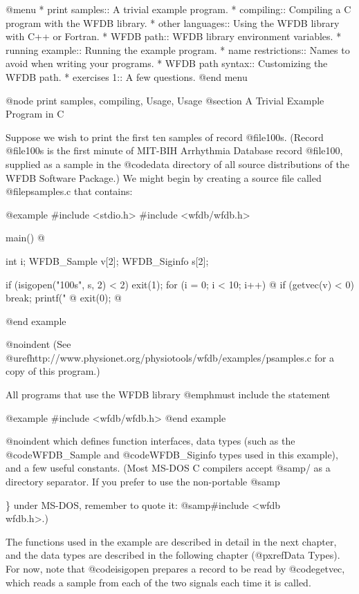 {@menu
* print samples::		A trivial example program.
* compiling::			Compiling a C program with the WFDB library.
* other languages::             Using the WFDB library with C++ or Fortran.
* WFDB path::			WFDB library environment variables.
* running example::		Running the example program.
* name restrictions::		Names to avoid when writing your programs.
* WFDB path syntax::		Customizing the WFDB path.
* exercises 1::			A few questions.
@end menu

@node     print samples, compiling, Usage, Usage
@section A Trivial Example Program in C

Suppose we wish to print the first ten samples of record @file{100s}.
(Record @file{100s} is the first minute of MIT-BIH Arrhythmia Database
record @file{100}, supplied as a sample in the @code{data} directory of all
source distributions of the WFDB Software Package.)  We might begin by
creating a source file called @file{psamples.c} that contains:

@example
#include <stdio.h>
#include <wfdb/wfdb.h>

main()
@{
    int i;
    WFDB_Sample v[2];
    WFDB_Siginfo s[2];

    if (isigopen("100s", s, 2) < 2)
        exit(1);
    for (i = 0; i < 10; i++) @{
        if (getvec(v) < 0)
            break;
        printf("%
    @}
    exit(0);
@}
@end example

@noindent
(See @uref{http://www.physionet.org/physiotools/wfdb/examples/psamples.c}
for a copy of this program.)

All programs that use the WFDB library @emph{must} include the
statement

@example
#include <wfdb/wfdb.h>
@end example

@noindent
which defines function interfaces, data types (such as the
@code{WFDB_Sample} and @code{WFDB_Siginfo} types used in this example), and
a few useful constants.  (Most MS-DOS C compilers accept @samp{/} as a
directory separator.  If you prefer to use the non-portable @samp{\}
under MS-DOS, remember to quote it: @samp{#include <wfdb\\wfdb.h>}.)

The functions used in the example are described in detail in the next
chapter, and the data types are described in the following chapter
(@pxref{Data Types}).  For now, note that @code{isigopen} prepares a
record to be read by @code{getvec}, which reads a sample from each of
the two signals each time it is called.  

}}
